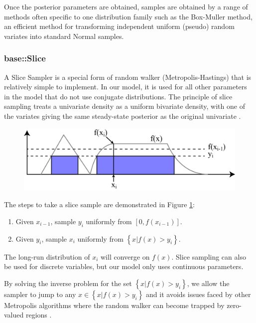 \documentclass[a4paper, 12pt]{article}
\begin{document}
Once the posterior parameters are obtained, samples are obtained by a range of methods often specific to one distribution family such as the Box-Muller method, an efficient method for transforming independent uniform (pseudo) random variates into standard Normal samples.

\subsubsection{base::Slice}
A Slice Sampler is a special form of random walker (Metropolis-Hastings) that is relatively simple to implement. In our model, it is used for all other parameters in the model that do not use conjugate distributions. The principle of slice sampling treats a univariate density as a uniform bivariate density, with one of the variates giving the same steady-state posterior as the original univariate \cite{Neal:2003}.

\begin{figure}
  \centering
  \includegraphics[width=0.5\linewidth]{media/slice_sampling}
  \label{fig:slice_sampling}
\end{figure}

The steps to take a slice sample are demonstrated in Figure \ref{fig:slice_sampling}:

\begin{enumerate}
\item Given $x_{i-1}$, sample $y_i$ uniformly from $[0, f(x_{i-1})]$.
\item Given $y_i$, sample $x_i$ uniformly from $\left\{ x | f(x) > y_i \right\}$.
\end{enumerate}

The long-run distribution of $x_i$ will converge on $f(x)$. Slice sampling can also be used for discrete variables, but our model only uses continuous parameters.

By solving the inverse problem for the set $\left\{ x | f(x) > y_i \right\}$, we allow the sampler to jump to any $x\in \left\{ x | f(x) > y_i \right\}$ and it avoids issues faced by other Metropolis algorithms where the random walker can become trapped by zero-valued regions .
\end{document}
